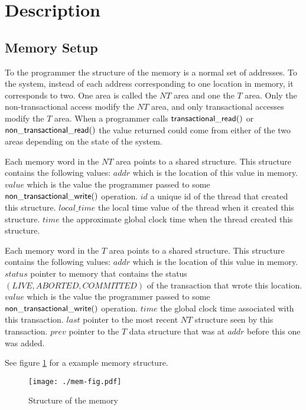 \documentclass[11pt]{article}
\begin{document}
\section{Description}

\subsection{Memory Setup}
To the programmer the structure of the memory is a normal set of addresses.
To the system, instead of each address corresponding to one location in memory, it corresponds to two.
One area is called the $NT$ area and one the $T$ area.
Only the non-transactional access modify the $NT$ area, and only transactional accesses modify the $T$ area.
When a programmer calls ${\sf transactional\_read}()$ or ${\sf non\_transactional\_read}()$ the value returned could come from either
of the two areas depending on the state of the system.

Each memory word in the $NT$ area points to a shared structure.
This structure contains the following values:
$addr$ which is the location of this value in memory.
$value$ which is the value the programmer passed to some ${\sf non\_transactional\_write}()$ operation.
$id$ a unique id of the thread that created this structure.
$local\_time$ the local time value of the thread when it created this structure.
$time$ the approximate global clock time when the thread created this structure.

Each memory word in the $T$ area points to a shared structure.
This structure contains the following values:
$addr$ which is the location of this value in memory.
$status$ pointer to memory that contains the status $(\mathit{LIVE}, \mathit{ABORTED}, \mathit{COMMITTED})$ of the transaction that wrote this location.
$value$ which is the value the programmer passed to some ${\sf non\_transactional\_write}()$ operation.
$time$ the global clock time associated with this transaction.
$last$ pointer to the most recent $NT$ structure seen by this transaction.
$prev$ pointer to the $T$ data structure that was at $addr$ before this one was added.

See figure \ref{fig:mem} for a example memory structure.

\begin{figure}[t]
	\begin{center}
	\texttt{[image: ./mem-fig.pdf]}
	\caption{Structure of the memory\label{fig:mem}}
	\end{center}
\end{figure}
\end{document}

